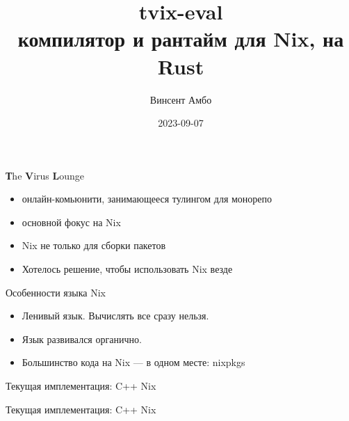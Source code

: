 \documentclass[12pt]{beamer}
\title{tvix-eval \\ компилятор и рантайм для Nix, на Rust}
\date{2023-09-07}
\author{Винсент Амбо}
\institute{TVL}
\newenvironment{code}{\ttfamily}{\par}
\begin{document}
  \begin{frame}
    \begin{center}
      \titlepage
    \end{center}
  \end{frame}

  \begin{frame}
    \begin{center}
      \titlepage
    \end{center}
  \end{frame}

  \begin{frame}{\textbf{Т}he \textbf{V}irus \textbf{L}ounge}
    \begin{itemize}
    \item онлайн-комьюнити, занимающееся тулингом для монорепо
    \item основной фокус на Nix
    \item Nix не только для сборки пакетов
    \item Хотелось решение, чтобы использовать Nix везде
    \end{itemize}
  \end{frame}

  \begin{frame}{Особенности языка Nix}
    \begin{itemize}
    \item Ленивый язык. Вычислять все сразу нельзя.
    \item Язык развивался органично.
    \item Большинство кода на Nix --- в одном месте: \begin{code}nixpkgs\end{code}
    \end{itemize}
  \end{frame}

  \begin{frame}{Текущая имплементация: C++ Nix}
    
  \end{frame}

  \begin{frame}{Текущая имплементация: C++ Nix}
    
  \end{frame}

\end{document}
